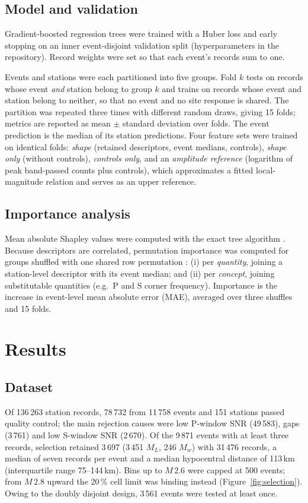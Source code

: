 \documentclass[11pt,a4paper]{article}
\begin{document}
\subsection{Model and validation}
Gradient-boosted regression trees \citep{ke2017} were trained with a Huber
loss and early stopping on an inner event-disjoint validation split
(hyperparameters in the repository). Record weights were set so that each
event's records sum to one.

Events and stations were each partitioned into five groups. Fold $k$ tests on
records whose event \emph{and} station belong to group $k$ and trains on
records whose event and station belong to neither, so that no event and no
site response is shared. The partition was repeated three times with
different random draws, giving 15 folds; metrics are reported as mean $\pm$
standard deviation over folds. The event prediction is the median of its
station predictions. Four feature sets were trained on identical folds:
\emph{shape} (retained descriptors, event medians, controls), \emph{shape only}
(without controls), \emph{controls only}, and an \emph{amplitude reference}
(logarithm of peak band-passed counts plus controls), which approximates a
fitted local-magnitude relation and serves as an upper reference.

\subsection{Importance analysis}
Mean absolute Shapley values were computed with the exact tree algorithm
\citep{lundberg2020}. Because descriptors are correlated, permutation
importance \citep{breiman2001} was computed for groups shuffled with one
shared row permutation \citep[cf.][]{strobl2008}: (i) per \emph{quantity}, joining
a station-level descriptor with its event median; and (ii) per \emph{concept},
joining substitutable quantities (e.g.\ P and S corner frequency). Importance
is the increase in event-level mean absolute error (MAE), averaged over three
shuffles and 15 folds.

\section{Results}
\label{sec:results}

\subsection{Dataset}
Of 136\,263 station records, 78\,732 from 11\,758 events and 151 stations passed
quality control; the main rejection causes were low P-window SNR (49\,583),
gaps (3\,761) and low S-window SNR (2\,670). Of the 9\,871 events with at least
three records, selection retained 3\,697 (3\,451 $M_L$, 246 $M_w$) with
31\,476 records, a median of seven records per event and a median hypocentral
distance of 113\,km (interquartile range 75--144\,km). Bins up to $M\,2.6$
were capped at 500 events; from $M\,2.8$ upward the 20\,\% cell limit was
binding instead (Figure~\ref{fig:selection}). Owing to the doubly disjoint design,
3\,561 events were tested at least once.
\end{document}
